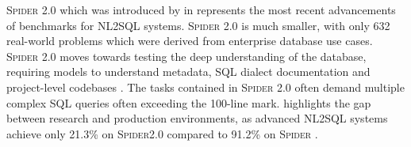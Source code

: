 \textsc{Spider 2.0} which was introduced by \citeauthor*{Spider2} in
\citeyear{Spider2} represents the most recent advancements of benchmarks for
NL2SQL systems. \textsc{Spider 2.0} is much smaller, with only 632 real-world
problems which were derived from enterprise database use cases. \textsc{Spider
2.0} moves towards testing the deep understanding of the database, requiring
models to understand metadata, SQL dialect documentation and project-level
codebases \citep{Spider2}. The tasks contained in \textsc{Spider 2.0} often
demand multiple complex SQL queries often exceeding the 100-line mark.
\citeauthor{Spider2} highlights the gap between research and production
environments, as advanced NL2SQL systems achieve only 21.3\% on
\textsc{Spider2.0} compared to 91.2\% on \textsc{Spider}
\citep{Spider, Spider2}.
